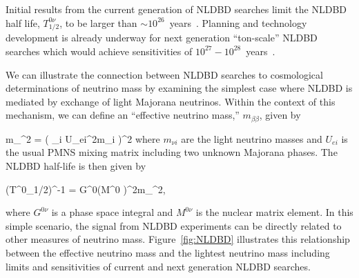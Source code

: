 Initial results from the current generation of NLDBD searches limit the NLDBD half life, $T^{0\nu}_{1/2}$, to be larger than  $\sim10^{26}$~years~\cite{Agostini:2013mzu,Auger:2012ar,Artusa:2014lgv,KamLAND-Zen:2016pfg}.%
 Planning and technology development is already underway for next generation ``ton-scale'' NLDBD searches which would achieve sensitivities of $10^{27}-10^{28}$~years~\cite{Geesaman:2015fha}.

We can illustrate the connection between NLDBD searches to cosmological determinations of neutrino mass by examining the simplest case where NLDBD is mediated by exchange of light Majorana neutrinos. Within the context of this mechanism, we can define an ``effective neutrino mass,'' $m_{\beta\beta}$, given by 

\beq
m_{\beta\beta}^{2} = ( \sum_i U_{ei}^{2}m_{\nu i} )^{2}
\label{eq:mbb}
\eeq
where $m_{\nu i}$ are the light neutrino masses and $U_{ei}$ is the usual PMNS mixing matrix including two unknown Majorana phases. The NLDBD half-life is then given by 

\beq
(T^{0\nu}_{1/2})^{-1} = G^{0\nu}\cdot (M^{0\nu} )^{2}\cdot m_{\beta\beta}^2,
\eeq

where $G^{0\nu}$ is a phase space integral and $M^{0\nu}$ is the nuclear matrix element. In this simple scenario, the signal from NLDBD experiments can be directly related to other measures of neutrino mass. Figure~\ref{fig:NLDBD} illustrates this relationship between the effective neutrino mass and the lightest neutrino mass including limits and sensitivities of current and next generation NLDBD searches.

